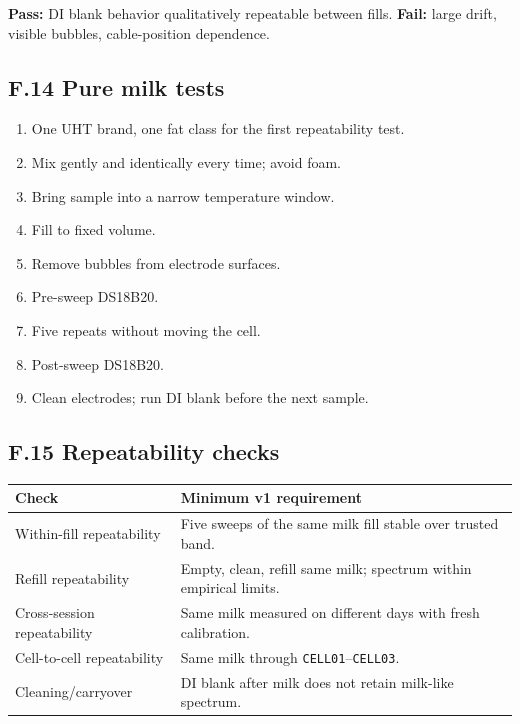 \documentclass[11pt,a4paper]{article}
\begin{document}
\begin{gatebox}
\textbf{Pass:} DI blank behavior qualitatively repeatable between fills. \textbf{Fail:} large drift, visible bubbles, cable-position dependence.
\end{gatebox}

\subsection{F.14 Pure milk tests}

\begin{enumerate}
\item One UHT brand, one fat class for the first repeatability test.
\item Mix gently and identically every time; avoid foam.
\item Bring sample into a narrow temperature window.
\item Fill to fixed volume.
\item Remove bubbles from electrode surfaces.
\item Pre-sweep DS18B20.
\item Five repeats without moving the cell.
\item Post-sweep DS18B20.
\item Clean electrodes; run DI blank before the next sample.
\end{enumerate}

\subsection{F.15 Repeatability checks}

\begin{xltabular}{\textwidth}{L{40mm}Y}
\toprule
\textbf{Check} & \textbf{Minimum v1 requirement}\\
\midrule
Within-fill repeatability & Five sweeps of the same milk fill stable over trusted band.\\
Refill repeatability & Empty, clean, refill same milk; spectrum within empirical limits.\\
Cross-session repeatability & Same milk measured on different days with fresh calibration.\\
Cell-to-cell repeatability & Same milk through \texttt{CELL01}--\texttt{CELL03}.\\
Cleaning/carryover & DI blank after milk does not retain milk-like spectrum.\\
\bottomrule
\end{xltabular}
\end{document}

